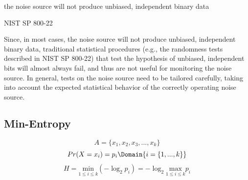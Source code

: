 the noise source will not produce unbiased, independent binary data

NIST SP 800-22

Since, in most cases,
the noise source will not produce unbiased, independent binary data, traditional statistical
procedures (e.g., the randomness tests described in NIST SP 800-22) that test the hypothesis of
unbiased, independent bits will almost always fail, and thus are not useful for monitoring the noise
source. In general, tests on the noise source need to be tailored carefully, taking into account the
expected statistical behavior of the correctly operating noise source.

\subsection{Min-Entropy}

\begin{equation}
	A = \{x_1, x_2, x_3, ..., x_k\}
	\label{eq:min-ent-A}
\end{equation}
\begin{equation}
	Pr(X=x_i) = p_i 
	\Domain{i=\{1,...,k\}}
\end{equation}
\begin{equation}
	H = \underset{1\leq i\leq k}{\mathrm{min}}(-\log_2p_i) = -\log_2 \underset{1\leq i\leq k}{\mathrm{max}}p_i
\end{equation}



